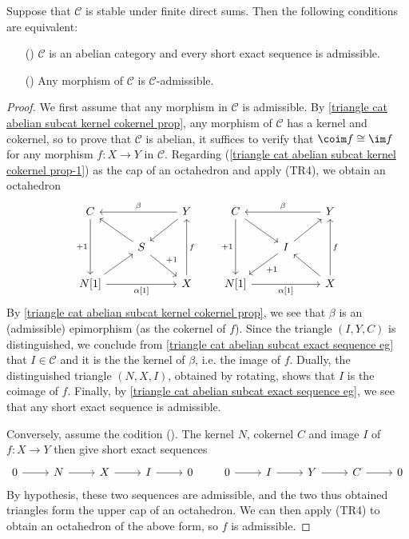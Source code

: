 \begin{proposition}\label{triangle cat abelian subcat iff morphism admissible}
Suppose that $\mathcal{C}$ is stable under finite direct sums. Then the following conditions are equivalent:
\begin{enumerate}
    \item[(\rmnum{1})] $\mathcal{C}$ is an abelian category and every short exact sequence is admissible.
    \item[(\rmnum{2})] Any morphism of $\mathcal{C}$ is $\mathcal{C}$-admissible.
\end{enumerate}
\end{proposition}
\begin{proof}
We first assume that any morphism in $\mathcal{C}$ is admissible. By \cref{triangle cat abelian subcat kernel cokernel prop}, any morphism of $\mathcal{C}$ has a kernel and cokernel, so to prove that $\mathcal{C}$ is abelian, it suffices to verify that $\coim f\cong\im f$ for any morphism $f:X\to Y$ in $\mathcal{C}$. Regarding (\ref{triangle cat abelian subcat kernel cokernel prop-1}) as the cap of an octahedron and apply (TR4), we obtain an octahedron
\[\begin{tikzcd}
C\ar[dd,swap,"+1"]&&Y\ar[ll,swap,"\beta"]\ar[ld]\\
&S\ar[rd,"+1"]\ar[lu]&\\
N[1]\ar[ru]\ar[rr,swap,"{\alpha[1]}"]&&X\ar[uu,swap,"f"]
\end{tikzcd}\quad\quad 
\begin{tikzcd}
C\ar[dd,swap,"+1"]\ar[rd]&&Y\ar[ll,swap,"\beta"]\\
&I\ar[ld,"+1"]\ar[ru]&\\
N[1]\ar[rr,swap,"{\alpha[1]}"]&&X\ar[uu,swap,"f"]\ar[lu]
\end{tikzcd}\]
By \cref{triangle cat abelian subcat kernel cokernel prop}, we see that $\beta$ is an (admissible) epimorphism (as the cokernel of $f$). Since the triangle $(I,Y,C)$ is distinguished, we conclude from \cref{triangle cat abelian subcat exact sequence eg} that $I\in\mathcal{C}$ and it is the the kernel of $\beta$, i.e. the image of $f$. Dually, the distinguished triangle $(N,X,I)$, obtained by rotating, shows that $I$ is the coimage of $f$. Finally, by \cref{triangle cat abelian subcat exact sequence eg}, we see that any short exact sequence is admissible.\par
Conversely, assume the codition (). The kernel $N$, cokernel $C$ and image $I$ of $f:X\to Y$ then give short exact sequences
\[\begin{tikzcd}
0\ar[r]&N\ar[r]&X\ar[r]&I\ar[r]&0
\end{tikzcd}\quad\quad \begin{tikzcd}
0\ar[r]&I\ar[r]&Y\ar[r]&C\ar[r]&0
\end{tikzcd}\]
By hypothesis, these two sequences are admissible, and the two thus obtained triangles form the upper cap of an octahedron. We can then apply (TR4) to obtain an octahedron of the above form, so $f$ is admissible.
\end{proof}

